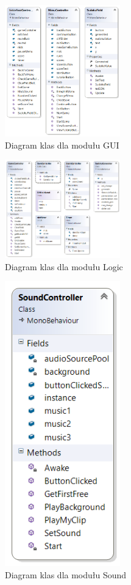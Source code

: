 \documentclass[a4paper, 11pt]{article}
\begin{document}
\begin{figure}[H]
	\centering
	\includegraphics[width=5cm]{zrzuty/class_gui.png}
	\caption{Diagram klas dla modułu GUI}
	\label{fig:class_gui}
\end{figure}
\begin{figure}[H]
	\centering
	\includegraphics[width=5cm]{zrzuty/class_logic.png}
	\caption{Diagram klas dla modułu Logic}
	\label{fig:class_logic}
\end{figure}
\begin{figure}[H]
	\centering
	\includegraphics[width=5cm]{zrzuty/class_sound.png}
	\caption{Diagram klas dla modułu Sound}
	\label{fig:class_sound}
\end{figure}
\end{document}
